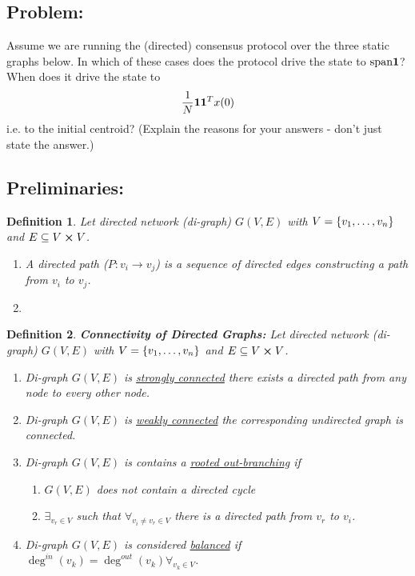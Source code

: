 \documentclass[]{article}
\numberwithin{equation}{section}
\newtheorem{definition}{Definition}
\begin{document}
\subsection*{Problem:}
Assume we are running the (directed) consensus protocol over the three static graphs below.
In which of these cases does the protocol drive the state to $\text{span}\vb{1}$?
When does it drive the state to \[
    \frac{1}{N} \vb{1} \vb{1}^T x(0)
\] i.e. to the initial centroid?
(Explain the reasons for your answers - don't just state the answer.)

\subsection*{Preliminaries:}
\begin{definition} 
    Let directed network (di-graph) $G(V,E)$ with $V = \qty{v_1,\dots,v_n}$ and $E \subseteq V \cross V$.
    \begin{enumerate}
        \item A directed path ($P : v_i \to v_j$) is a sequence of directed edges constructing a path from $v_i$ to $v_j$.
        \item 
    \end{enumerate}
\end{definition}

\begin{definition}
    \textbf{Connectivity of Directed Graphs:} 
    Let directed network (di-graph) $G(V,E)$ with $V = \qty{v_1,\dots,v_n}$ and $E \subseteq V \cross V$.
    \begin{enumerate}
        \item Di-graph $G(V,E)$ is \emph{\underline{strongly connected}} there exists a directed path from any node to every other node.
        \item Di-graph $G(V,E)$ is \emph{\underline{weakly connected}} the corresponding undirected graph is connected.
        \item Di-graph $G(V,E)$ is contains a \underline{\emph{rooted out-branching}} if \begin{enumerate}
            \item $G(V,E)$ does not contain a directed cycle
            \item $\exists_{v_r \in V}$ such that $\forall_{v_i \neq v_r \in V}$ there is a directed path from $v_r$ to $v_i$.
        \end{enumerate}
        \item  Di-graph $G(V,E)$ is considered \underline{\emph{balanced}} if $\deg^{in}(v_k) = \deg^{out}(v_k) \forall_{v_k \in V}$.
    \end{enumerate}
\end{definition}
\end{document}
